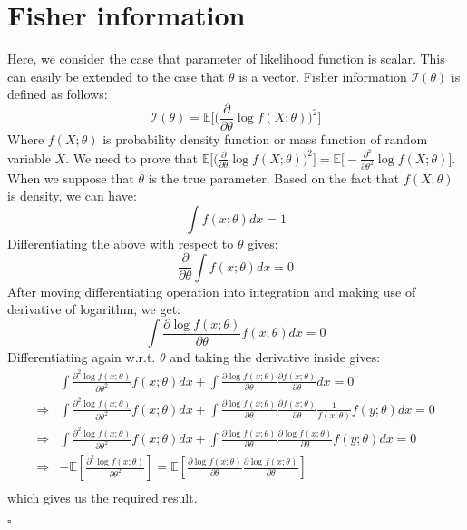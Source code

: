 \section{Fisher information} \label{appendix:fisher_matrix}
Here, we consider the case that parameter of likelihood function is scalar. This can easily be extended to the case that $\theta$ is a vector. Fisher information $\mathcal{I}(\theta)$ is defined as follows:
\begin{equation}
	\mathcal{I}(\theta) = \mathbb{E}\big[\big(\frac{\partial}{\partial \theta}\log{f(X; \theta)}\big)^2\big]
\end{equation}
Where $f(X;\theta)$ is probability density function or mass function of random variable $X$. We need to prove that $\mathbb{E}\big[\big(\frac{\partial}{\partial \theta}\log{f(X; \theta)}\big)^2\big] = \mathbb{E}\big[-\frac{\partial^2}{\partial \theta^2}\log{f(X; \theta)}\big]$.
When we suppose that $\theta$ is the true parameter. Based on the fact that $f(X;\theta)$ is density, we can have:
\[
\int f(x;\theta) dx = 1
\]
Differentiating the above with respect to $\theta$ gives:
\[
\frac{\partial}{\partial \theta}\int f(x;\theta) dx = 0
\]
After moving differentiating operation into integration and making use of derivative of logarithm, we get:
\[
\int \frac{\partial \log f(x;\theta)}{\partial \theta} f(x;\theta) dx = 0
\]
Differentiating again w.r.t. $\theta$ and taking the derivative inside gives:
\[
\begin{aligned}
&\int \frac{\partial^2\log f(x;\theta)}{\partial \theta^2}f(x;\theta) dx + \int \frac{\partial\log f(x;\theta)}{\partial \theta} \frac{\partial f(x;\theta)}{\partial \theta}dx
= 0\\
\Rightarrow &\int \frac{\partial^2\log f(x;\theta)}{\partial \theta^2}f(x;\theta) dx + \int \frac{\partial\log f(x;\theta)}{\partial \theta} \frac{\partial f(x;\theta)}{\partial \theta}\frac{1}{f(x;\theta)} f(y;\theta) dx= 0 \\
\Rightarrow &\int \frac{\partial^2\log f(x;\theta)}{\partial \theta^2}f(x;\theta) dx + \int \frac{\partial\log f(x;\theta)}{\partial \theta} \frac{\partial \log f(x;\theta)}{\partial \theta} f(y;\theta) dx= 0 \\
\Rightarrow & -\mathbb{E}[\frac{\partial^2\log f(x;\theta)}{\partial \theta^2}] = \mathbb{E}[\frac{\partial\log f(x;\theta)}{\partial \theta} \frac{\partial \log f(x;\theta)}{\partial \theta} ] \\
\end{aligned}
\]
which gives us the required result.
 \begin{flushright}
 	$\square$
 \end{flushright}
 


